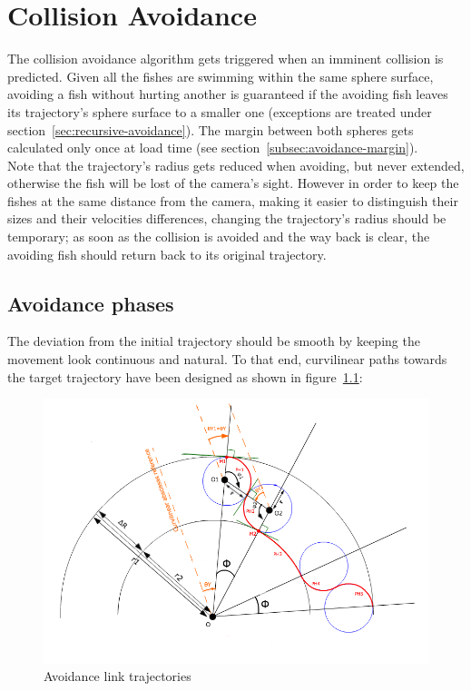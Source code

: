 \chapter{Collision Avoidance}
\label{chap:avoidance}

The collision avoidance algorithm gets triggered when an imminent collision is predicted. Given all the fishes are swimming within the same sphere surface, avoiding a fish without hurting another is guaranteed if the avoiding fish leaves its trajectory's sphere surface to a smaller one (exceptions are treated under section~\ref{sec:recursive-avoidance}). The margin between both spheres gets calculated only once at load time (see section~\ref{subsec:avoidance-margin}).\\

Note that the trajectory's radius gets reduced when avoiding, but never extended, otherwise the fish will be lost of the camera's sight. However in order to keep the  fishes at the same distance from the camera, making it easier to distinguish their sizes and their velocities differences, changing the trajectory's radius should be temporary; as soon as the collision is avoided and the way back is clear, the avoiding fish should return back to its original trajectory.\\

\section{Avoidance phases}
\label{sec:av-phases}

The deviation from the initial trajectory should be smooth by keeping the movement  look continuous and natural. To that end, curvilinear paths towards the target trajectory have been designed as shown in figure~\ref{fig:link}:

\begin{figure}[H]
   \centering
   \includegraphics[scale=0.55]{figures/link-trajectory.png}
   \caption{Avoidance link trajectories}
   \label{fig:link}
\end{figure}


